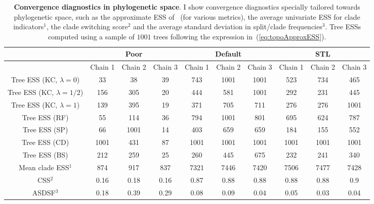 \begin{sidewaystable}[!ht]
\begin{center}
 \centering
\caption[Convergence diagnostics in phylogenetic space.]{\textbf{Convergence diagnostics in phylogenetic space}.
I show convergence diagnostics specially tailored towards phylogenetic space, such as the approximate ESS of~\cite{Lanfear2016} (for various metrics), the average univariate ESS for clade indicators$^1$, the clade switching score$^2$ and the average standard deviation in split/clade frequencies$^3$.
Tree ESSs computed using a sample of $1001$ trees following the expression in~(\ref{eq:topoApproxESS}).
}
\label{tab:tree_results}
\begin{tabular}{cccc|ccc|ccc}
\toprule
                 & \multicolumn{3}{c}{Poor}    & \multicolumn{3}{c}{Default} & \multicolumn{3}{c}{STL}     \\
                 \midrule  
                 & Chain 1 & Chain 2 & Chain 3 & Chain 1 & Chain 2 & Chain 3 & Chain 1 & Chain 2 & Chain 3 \\
                 \midrule  
Tree ESS (KC, $\lambda = 0$)   & 33      & 38      & 39      & 743     & 1001    & 1001    & 523     & 734     & 465     \\
Tree ESS (KC, $\lambda = 1/2$) & 156     & 305     & 20      & 444     & 581     & 1001    & 292     & 231     & 445     \\
Tree ESS (KC, $\lambda = 1$)   & 139     & 395     & 19      & 371     & 705     & 711     & 276     & 276     & 1001    \\
Tree ESS (RF)    & 55      & 114     & 36      & 794     & 1001    & 801     & 695     & 624     & 787     \\
Tree ESS (SP)    & 66      & 1001    & 14      & 403     & 659     & 659     & 184     & 155     & 552     \\
Tree ESS (CD)    & 1001    & 431     &  87     & 1001    & 1001    & 1001    & 1001    & 1001    & 1001     \\
Tree ESS (BS)    & 212     &  259    &  25     & 260     & 445     & 675     & 232     & 241     & 340     \\
Mean clade ESS$^1$   & 874     & 917     & 837     & 7321    & 7446    & 7420    & 7506    & 7477    & 7428    \\
CSS$^2$              & 0.16    & 0.18    & 0.16    & 0.87    & 0.88    & 0.88    & 0.88    & 0.88    & 0.9     \\
ASDSF$^3$            & 0.18    & 0.39    & 0.29    & 0.08    & 0.09    & 0.04    & 0.05    & 0.03    & 0.04   \\
\bottomrule
\end{tabular}
\end{center}
\end{sidewaystable}

